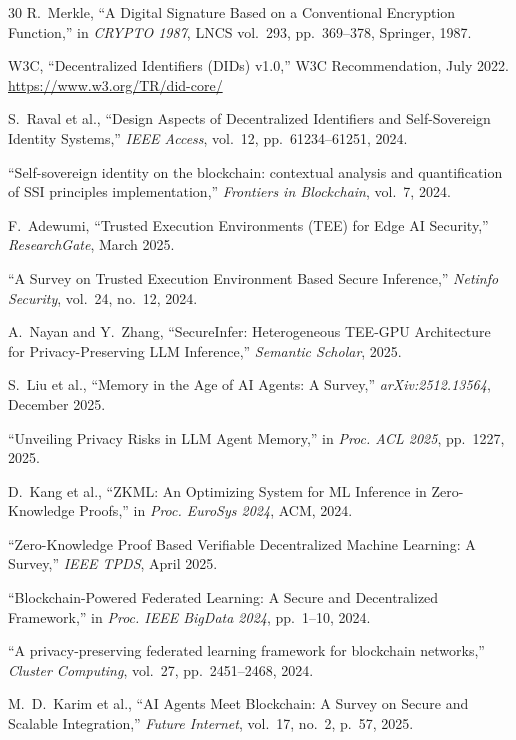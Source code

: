 \documentclass[10pt,a4paper]{article}
\theoremstyle{definition}
\theoremstyle{plain}
\begin{document}
\begin{thebibliography}{30}
R.~Merkle, ``A Digital Signature Based on a Conventional Encryption Function,'' in \textit{CRYPTO 1987}, LNCS vol.~293, pp.~369--378, Springer, 1987.

W3C, ``Decentralized Identifiers (DIDs) v1.0,'' W3C Recommendation, July 2022.
\url{https://www.w3.org/TR/did-core/}

S.~Raval et al., ``Design Aspects of Decentralized Identifiers and Self-Sovereign Identity Systems,'' \textit{IEEE Access}, vol.~12, pp.~61234--61251, 2024.

``Self-sovereign identity on the blockchain: contextual analysis and quantification of SSI principles implementation,'' \textit{Frontiers in Blockchain}, vol.~7, 2024.

F.~Adewumi, ``Trusted Execution Environments (TEE) for Edge AI Security,'' \textit{ResearchGate}, March 2025.

``A Survey on Trusted Execution Environment Based Secure Inference,'' \textit{Netinfo Security}, vol.~24, no.~12, 2024.

A.~Nayan and Y.~Zhang, ``SecureInfer: Heterogeneous TEE-GPU Architecture for Privacy-Preserving LLM Inference,'' \textit{Semantic Scholar}, 2025.

S.~Liu et al., ``Memory in the Age of AI Agents: A Survey,'' \textit{arXiv:2512.13564}, December 2025.

``Unveiling Privacy Risks in LLM Agent Memory,'' in \textit{Proc. ACL 2025}, pp.~1227, 2025.

D.~Kang et al., ``ZKML: An Optimizing System for ML Inference in Zero-Knowledge Proofs,'' in \textit{Proc. EuroSys 2024}, ACM, 2024.

``Zero-Knowledge Proof Based Verifiable Decentralized Machine Learning: A Survey,'' \textit{IEEE TPDS}, April 2025.

``Blockchain-Powered Federated Learning: A Secure and Decentralized Framework,'' in \textit{Proc. IEEE BigData 2024}, pp.~1--10, 2024.

``A privacy-preserving federated learning framework for blockchain networks,'' \textit{Cluster Computing}, vol.~27, pp.~2451--2468, 2024.

M.~D.~Karim et al., ``AI Agents Meet Blockchain: A Survey on Secure and Scalable Integration,'' \textit{Future Internet}, vol.~17, no.~2, p.~57, 2025.


\end{thebibliography}
\end{document}
